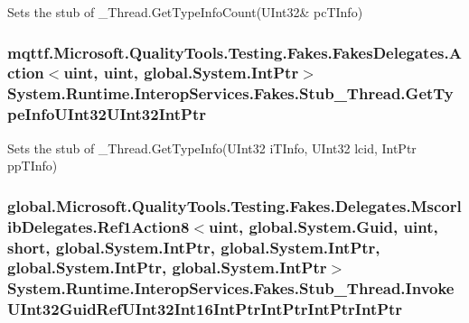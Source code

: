 Sets the stub of \-\_\-\-Thread.\-Get\-Type\-Info\-Count(U\-Int32\& pc\-T\-Info)

\hypertarget{class_system_1_1_runtime_1_1_interop_services_1_1_fakes_1_1_stub___thread_a07392e5033d17969feb89f88dfd06e15}{
\subsubsection[{Get\-Type\-Info\-U\-Int32\-U\-Int32\-Int\-Ptr}]{\setlength{\rightskip}{0pt plus 5cm}mqttf.\-Microsoft.\-Quality\-Tools.\-Testing.\-Fakes.\-Fakes\-Delegates.\-Action$<$uint, uint, global.\-System.\-Int\-Ptr$>$ System.\-Runtime.\-Interop\-Services.\-Fakes.\-Stub\-\_\-\-Thread.\-Get\-Type\-Info\-U\-Int32\-U\-Int32\-Int\-Ptr}}\label{class_system_1_1_runtime_1_1_interop_services_1_1_fakes_1_1_stub___thread_a07392e5033d17969feb89f88dfd06e15}


Sets the stub of \-\_\-\-Thread.\-Get\-Type\-Info(\-U\-Int32 i\-T\-Info, U\-Int32 lcid, Int\-Ptr pp\-T\-Info)

\hypertarget{class_system_1_1_runtime_1_1_interop_services_1_1_fakes_1_1_stub___thread_a06e4be62d45beb10c1515628c4c27804}{
\subsubsection[{Invoke\-U\-Int32\-Guid\-Ref\-U\-Int32\-Int16\-Int\-Ptr\-Int\-Ptr\-Int\-Ptr\-Int\-Ptr}]{\setlength{\rightskip}{0pt plus 5cm}global.\-Microsoft.\-Quality\-Tools.\-Testing.\-Fakes.\-Delegates.\-Mscorlib\-Delegates.\-Ref1\-Action8$<$uint, global.\-System.\-Guid, uint, short, global.\-System.\-Int\-Ptr, global.\-System.\-Int\-Ptr, global.\-System.\-Int\-Ptr, global.\-System.\-Int\-Ptr$>$ System.\-Runtime.\-Interop\-Services.\-Fakes.\-Stub\-\_\-\-Thread.\-Invoke\-U\-Int32\-Guid\-Ref\-U\-Int32\-Int16\-Int\-Ptr\-Int\-Ptr\-Int\-Ptr\-Int\-Ptr}}\label{class_system_1_1_runtime_1_1_interop_services_1_1_fakes_1_1_stub___thread_a06e4be62d45beb10c1515628c4c27804}


